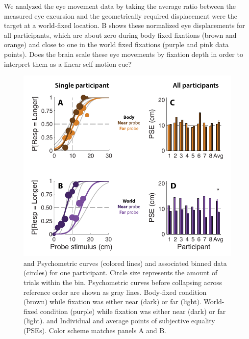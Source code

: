 We analyzed the eye movement data by taking the average ratio between the measured eye excursion and the geometrically required displacement were the target at a world-fixed location. B shows these normalized eye displacements for all participants, which are about zero during body fixed fixations (brown and orange) and close to one in the world fixed fixations (purple and pink data points). Does the brain scale these eye movements by fixation depth in order to interpret them as a linear self-motion cue?

\begin{figure}
    \includegraphics[width=1.0\textwidth]{src/paper4/p4_figure3.pdf}

	\caption{ and  Psychometric curves (colored lines) and associated binned data (circles) for one participant. Circle size represents the amount of trials within the bin. Psychometric curves before collapsing across reference order are shown as gray lines.  Body-fixed condition (brown) while fixation was either near (dark) or far (light).  World-fixed condition (purple) while fixation was either near (dark) or far (light).
	 and  Individual and average points of subjective equality (PSEs). Color scheme matches panels A and B.
	}
	\label{p4:fig3}
\end{figure}

